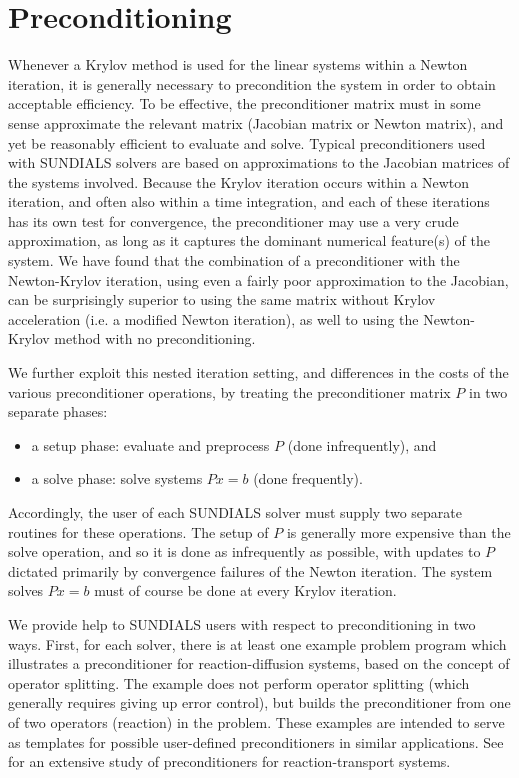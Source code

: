 \section{Preconditioning}\label{s:preconditioning}

Whenever a Krylov method is used for the linear systems within a
Newton iteration, it is generally necessary to precondition the system
in order to obtain acceptable efficiency.  To be effective, the
preconditioner matrix must in some sense approximate the relevant
matrix (Jacobian matrix or Newton matrix), and yet be reasonably
efficient to evaluate and solve.  Typical preconditioners used with
SUNDIALS solvers are based on approximations to the Jacobian matrices
of the systems involved.  Because the Krylov iteration occurs within a
Newton iteration, and often also within a time integration, and each
of these iterations has its own test for convergence, the
preconditioner may use a very crude approximation, as long as it
captures the dominant numerical feature(s) of the system.  
We have found that the combination of a preconditioner with the
Newton-Krylov iteration, using even a fairly poor approximation to
the Jacobian, can be surprisingly superior to using the same matrix
without Krylov acceleration (i.e. a modified Newton iteration), as
well to using the Newton-Krylov method with no preconditioning.

We further exploit this nested iteration setting, and differences in
the costs of the various preconditioner operations, by treating the
preconditioner matrix $P$ in two separate phases:
\begin{itemize}
\item a setup phase: evaluate and preprocess $P$ (done infrequently), and
\item a solve phase: solve systems $Px = b$ (done frequently).
\end{itemize}
Accordingly, the user of each SUNDIALS solver must supply two separate
routines for these operations.  The setup of $P$ is generally more
expensive than the solve operation, and so it is done as infrequently
as possible, with updates to $P$ dictated primarily by convergence
failures of the Newton iteration.  The system solves $Px = b$ must of
course be done at every Krylov iteration.

We provide help to SUNDIALS users with respect to preconditioning in
two ways.  First, for each solver, there is at least one example
problem program which illustrates a preconditioner for
reaction-diffusion systems, based on the concept of operator
splitting.  The example does not perform operator splitting (which
generally requires giving up error control), but builds the
preconditioner from one of two operators (reaction) in the problem.
These examples are intended to serve as templates for possible
user-defined preconditioners in similar applications.  See
\cite{BrHi:89} for an extensive study of preconditioners for
reaction-transport systems.

